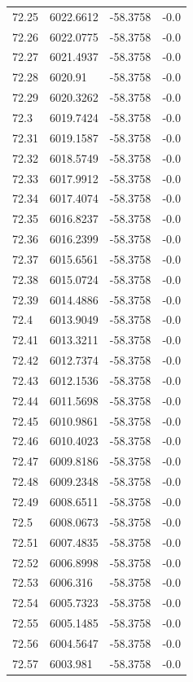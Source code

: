 \begin{table}[H]
\begin{tabular}{llll}
72.25 & 6022.6612 & -58.3758 & -0.0 \\
72.26 & 6022.0775 & -58.3758 & -0.0 \\
72.27 & 6021.4937 & -58.3758 & -0.0 \\
72.28 & 6020.91 & -58.3758 & -0.0 \\
72.29 & 6020.3262 & -58.3758 & -0.0 \\
72.3 & 6019.7424 & -58.3758 & -0.0 \\
72.31 & 6019.1587 & -58.3758 & -0.0 \\
72.32 & 6018.5749 & -58.3758 & -0.0 \\
72.33 & 6017.9912 & -58.3758 & -0.0 \\
72.34 & 6017.4074 & -58.3758 & -0.0 \\
72.35 & 6016.8237 & -58.3758 & -0.0 \\
72.36 & 6016.2399 & -58.3758 & -0.0 \\
72.37 & 6015.6561 & -58.3758 & -0.0 \\
72.38 & 6015.0724 & -58.3758 & -0.0 \\
72.39 & 6014.4886 & -58.3758 & -0.0 \\
72.4 & 6013.9049 & -58.3758 & -0.0 \\
72.41 & 6013.3211 & -58.3758 & -0.0 \\
72.42 & 6012.7374 & -58.3758 & -0.0 \\
72.43 & 6012.1536 & -58.3758 & -0.0 \\
72.44 & 6011.5698 & -58.3758 & -0.0 \\
72.45 & 6010.9861 & -58.3758 & -0.0 \\
72.46 & 6010.4023 & -58.3758 & -0.0 \\
72.47 & 6009.8186 & -58.3758 & -0.0 \\
72.48 & 6009.2348 & -58.3758 & -0.0 \\
72.49 & 6008.6511 & -58.3758 & -0.0 \\
72.5 & 6008.0673 & -58.3758 & -0.0 \\
72.51 & 6007.4835 & -58.3758 & -0.0 \\
72.52 & 6006.8998 & -58.3758 & -0.0 \\
72.53 & 6006.316 & -58.3758 & -0.0 \\
72.54 & 6005.7323 & -58.3758 & -0.0 \\
72.55 & 6005.1485 & -58.3758 & -0.0 \\
72.56 & 6004.5647 & -58.3758 & -0.0 \\
72.57 & 6003.981 & -58.3758 & -0.0 \\

\end{tabular}
\end{table}
